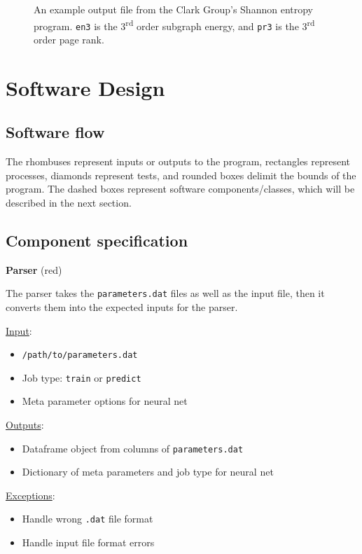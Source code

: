 \documentclass[paper=a4, fontsize=12pt]{article}
\begin{document}
\begin{figure}
  \caption[width=0.8\textwidth]{An example output file from the Clark Group's Shannon entropy program.
  \texttt{en3} is the 3\textsuperscript{rd} order subgraph energy,
  and \texttt{pr3} is the 3\textsuperscript{rd} order page rank.}
  \label{output}
\end{figure}

\section*{Software Design}

\newpage

\subsection*{Software flow}



The rhombuses represent inputs or outputs to the program,
rectangles represent processes,
diamonds represent tests,
and rounded boxes delimit the bounds of the program.
The dashed boxes represent software components/classes, which will be described in the next section.

\subsection*{Component specification}

{\noindent \large \textbf{Parser} (red)}

The parser takes the \texttt{parameters.dat} files as well as the input file,
then it converts them into the expected inputs for the parser. 
 
\underline{Input}:
\begin{itemize}
  \item \texttt{/path/to/parameters.dat}
  \item Job type: \texttt{train} or \texttt{predict}
  \item Meta parameter options for neural net
\end{itemize}

\underline{Outputs}:
\begin{itemize}
  \item Dataframe object from columns of \texttt{parameters.dat}
  \item Dictionary of meta parameters and job type for neural net
\end{itemize}

\underline{Exceptions}:
\begin{itemize}
  \item Handle wrong \texttt{.dat} file format
  \item Handle input file format errors
\end{itemize}
\end{document}

